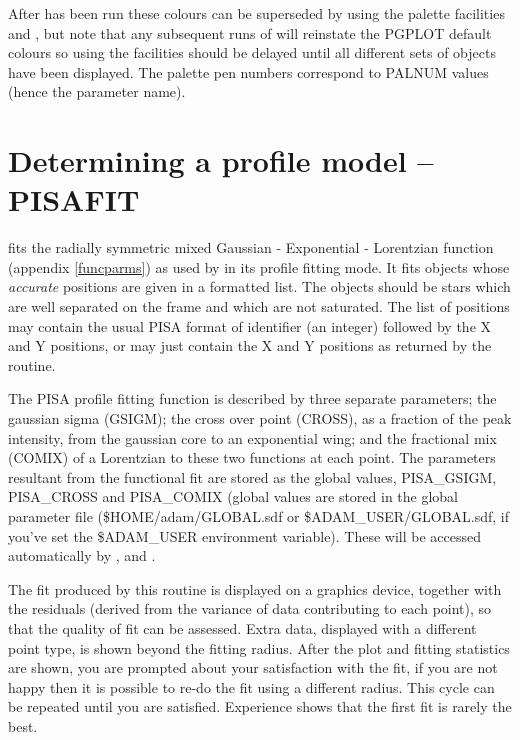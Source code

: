 After  has been run these colours can be superseded by
using the  palette facilities
 and , but
note that any subsequent runs of  will reinstate the
PGPLOT default colours so using the  facilities
should be delayed until all different sets of objects have been
displayed. The  palette pen numbers correspond to
PALNUM values (hence the parameter name).


\section{Determining a profile model -- PISAFIT}
 fits the radially symmetric mixed Gaussian -
Exponential - Lorentzian function (appendix \ref{funcparms}) as used
by  in its profile fitting mode. It fits objects whose
{\em accurate} positions are given in a formatted list. The objects
should be stars which are well separated on the frame and which are
not saturated. The list of positions may contain the usual PISA format
of identifier (an integer) followed by the X and Y positions, or may
just contain the X and Y positions as returned by the  routine.

The PISA profile fitting function is described by three separate
parameters; the gaussian sigma (GSIGM); the cross over point (CROSS),
as a fraction of the peak intensity, from the gaussian core to an
exponential wing; and the fractional mix (COMIX) of a Lorentzian to
these two functions at each point.
The parameters resultant from the functional fit are stored as the
global values, PISA\_GSIGM, PISA\_CROSS and PISA\_COMIX (global values
are stored in the global parameter file (\$HOME/adam/GLOBAL.sdf or
\$ADAM\_USER/GLOBAL.sdf, if you've set the \$ADAM\_USER environment variable).
These will be accessed automatically by ,
 and .

The fit produced by this routine is displayed on a graphics device,
together with the residuals (derived from the variance of data
contributing to each point), so that the quality of fit can be
assessed.  Extra data, displayed with a different point type, is shown
beyond the fitting radius.  After the plot and fitting statistics are
shown, you are prompted about your satisfaction with the fit, if you
are not happy then it is possible to re-do the fit using a different
radius. This cycle can be repeated until you are satisfied.
Experience shows that the first fit is rarely the best.

